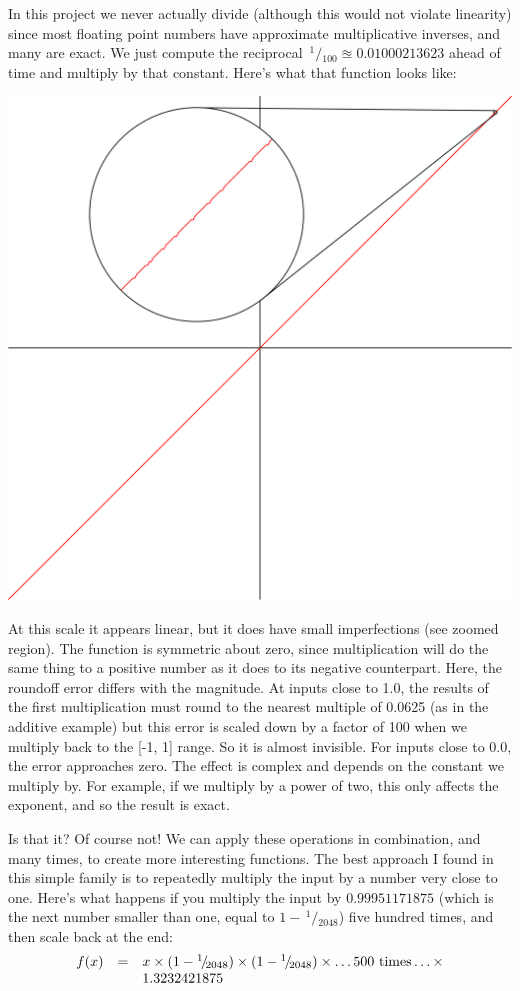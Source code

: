 \documentclass[twocolumn]{article}
\newcommand\sfrac[2]{\!{}\,^{#1}\!/{}\!_{#2}}
\begin{document}
In this project we never actually divide (although this would not
violate linearity) since most floating point numbers have approximate
multiplicative inverses, and many are exact. We just compute the
reciprocal $\sfrac{1}{100} \approxeq 0.01000213623$ ahead of time and
multiply by that constant. Here's what that function looks like:

\begin{center}
\includegraphics[width=0.45 \linewidth]{times100zoom}
\end{center}

At this scale it appears linear, but it does have small imperfections
(see zoomed region). The function is symmetric about zero, since
multiplication will do the same thing to a positive number as it does
to its negative counterpart. Here, the roundoff error differs with the
magnitude. At inputs close to 1.0, the results of the first
multiplication must round to the nearest multiple of 0.0625 (as in the
additive example) but this error is scaled down by a factor of 100
when we multiply back to the [-1, 1] range. So it is almost invisible.
For inputs close to 0.0, the error approaches zero. The effect is complex
and depends on the constant we multiply by. For example, if we multiply
by a power of two, this only affects the exponent, and so the result is
exact.

\medskip
Is that it? Of course not! We can apply these operations in
combination, and many times, to create more interesting functions. The
best approach I found in this simple family is to repeatedly multiply
the input by a number very close to one. Here's what happens if you
multiply the input by $0.99951171875$ (which is the next number
smaller than one, equal to $1 - \sfrac{1}{2048}$) five hundred times,
and then scale back at the end:
%
\[
\begin{array}{rcl}
  f(x) & = & x \times (1 - \sfrac{1}{2048}) \times (1 - \sfrac{1}{2048}) \times \ldots \textrm{500 times} \ldots \times \\
  \, & \, & 1.3232421875$$
\end{array}
\]
\end{document}
